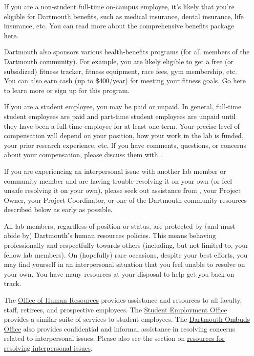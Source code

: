 \documentclass{tufte-book} %
\begin{document}

If you are a non-student full-time on-campus employee, it's likely
that you're eligible for Dartmouth benefits, such as medical
insurance, dental insurance, life insurance, etc.  You can read more
about the comprehensive benefits package
\href{http://www.dartmouth.edu/~hrs/benefits/}{here}.

Dartmouth also sponsors various health-benefits programs (for all
members of the Dartmouth community).  For example, you are likely
eligible to get a free (or subsidized) fitness tracker, fitness
equipment, race fees, gym membership, etc.  You can also earn cash (up
to \$400/year) for meeting your fitness goals.  Go
\href{http://join.virginpulse.com/dartmouth/}{here} to learn more or
sign up for this program.

If you are a student employee, you may be paid or unpaid.  In general,
full-time student employees are paid and part-time student employees
are unpaid until they have been a full-time employee for at least one
term.  Your precise level of compensation will depend on your
position, how your work in the lab is funded, your prior research
experience, etc.  If you have comments, questions, or concerns about
your compensation, please discuss them with \director.


If you are experiencing an interpersonal issue with another lab member
or community member and are having trouble resolving it on your own
(or feel unsafe resolving it on your own), please seek out assistance
from \director, your Project Owner, your Project Coordinator, or one
of the Dartmouth community resources described below as early as
possible.

All lab members, regardless of position or status, are protected by
(and must abide by) Dartmouth's human resources policies.  This means
behaving professionally and respectfully towards others (including,
but not limited to, your fellow lab members).  On (hopefully) rare
occasions, despite your best efforts, you may find yourself in an
interpersonal situation that you feel unable to resolve on your own.
You have many resources at your disposal to help get you back on
track.

The \href{http://www.dartmouth.edu/~hrs/}{Office of Human Resources}
provides assistance and resources to all faculty, staff, retirees, and
prospective employees. The
\href{http://www.dartmouth.edu/~seo/}{Student Employment Office}
provides a similar suite of services to student employees.  The
\href{http://www.dartmouth.edu/~ombuds/}{Dartmouth Ombuds Office} also
provides confidential and informal assistance in resolving concerns
related to interpersonal issues.  Please also see the section on
\hyperref[sec:interpersonal]{resources for resolving interpersonal
  issues}.
\end{document}

